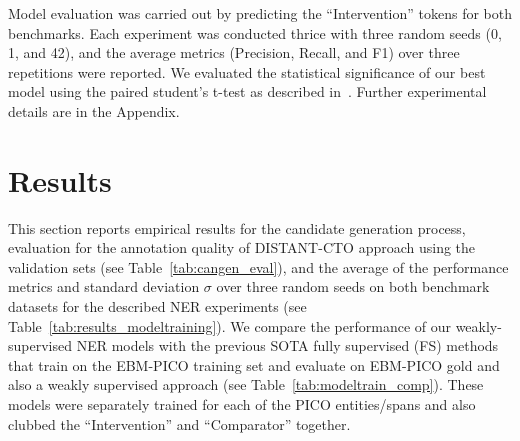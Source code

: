 \documentclass[11pt]{article}
\begin{document}
Model evaluation was carried out by predicting the ``Intervention'' tokens for both benchmarks.
Each experiment was conducted thrice with three random seeds (0, 1, and 42), and the average metrics (Precision, Recall, and F1) over three repetitions were reported.
We evaluated the statistical significance of our best model using the paired student's t-test as described in~\cite{dror2018hitchhiker}.
Further experimental details are in the Appendix.
%
%
%
\section{Results}
\label{sec:results}
%
This section reports empirical results for the candidate generation process, evaluation for the annotation quality of DISTANT-CTO approach using the validation sets (see Table~\ref{tab:cangen_eval}), and the average of the performance metrics and standard deviation $\sigma$ over three random seeds on both benchmark datasets for the described NER experiments (see Table~\ref{tab:results_modeltraining}).
We compare the performance of our weakly-supervised NER models with the previous SOTA fully supervised (FS) methods that train on the EBM-PICO training set and evaluate on EBM-PICO gold and also a weakly supervised approach  (see Table~\ref{tab:modeltrain_comp}).
These models were separately trained for each of the PICO entities/spans and also clubbed the ``Intervention'' and ``Comparator'' together.
%
%
%
\end{document}
